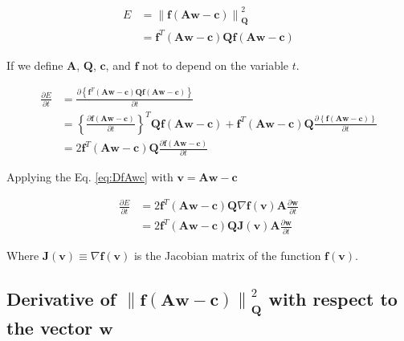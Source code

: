 \begin{align}
E&=\left\|\mathbf{f}\left(\mathbf{A}\mathbf{w}-\mathbf{c}\right)\right\|_{\mathbf{Q}}^2\\
~&=\mathbf{f}^{T}\left(\mathbf{A}\mathbf{w}-\mathbf{c}\right)\mathbf{Q}\mathbf{f}\left(\mathbf{A}\mathbf{w}-\mathbf{c}\right)
\end{align}

If we define $\mathbf{A}$, $\mathbf{Q}$, $\mathbf{c}$, and $\mathbf{f}$ not to depend on the variable $t$.

\begin{align}
\frac{\partial E}{\partial t}
&=\frac{\partial\left\{ \mathbf{f}^{T}\left(\mathbf{A}\mathbf{w}-\mathbf{c}\right)\mathbf{Q}\mathbf{f}\left(\mathbf{A}\mathbf{w}-\mathbf{c}\right)\right\}}{\partial t} \\
~
&=
\left\{\frac{\partial \mathbf{f}\left(\mathbf{A}\mathbf{w}-\mathbf{c}\right)}{\partial t} \right\}^{T}
\mathbf{Q}\mathbf{f}\left(\mathbf{A}\mathbf{w}-\mathbf{c}\right)
+
\mathbf{f}^{T}\left(\mathbf{A}\mathbf{w}-\mathbf{c}\right)\mathbf{Q}
\frac{\partial\left\{ \mathbf{f}\left(\mathbf{A}\mathbf{w}-\mathbf{c}\right)\right\}}{\partial t} \\
~
&=
2
\mathbf{f}^{T}\left(\mathbf{A}\mathbf{w}-\mathbf{c}\right)\mathbf{Q}
\frac{\partial \mathbf{f}\left(\mathbf{A}\mathbf{w}-\mathbf{c}\right)}{\partial t} 
\end{align}

Applying the Eq. \ref{eq:DfAwc} with $\mathbf{v}=\mathbf{A}\mathbf{w}-\mathbf{c}$

\begin{align}
\label{eq:dEdt}
\frac{\partial E}{\partial t}
&=
2
\mathbf{f}^{T}\left(\mathbf{A}\mathbf{w}-\mathbf{c}\right)\mathbf{Q}
\nabla \mathbf{f}(\mathbf{v})
\mathbf{A}\frac{\partial \mathbf{w}}{\partial t}\\
&=
2
\mathbf{f}^{T}\left(\mathbf{A}\mathbf{w}-\mathbf{c}\right)\mathbf{Q}
\mathbf{J}(\mathbf{v})
\mathbf{A}\frac{\partial \mathbf{w}}{\partial t}
\end{align}

Where $\mathbf{J}(\mathbf{v}) \equiv \nabla \mathbf{f}(\mathbf{v})$ is the Jacobian matrix of the function $\mathbf{f}(\mathbf{v})$.

\subsection{Derivative of $\left\|\mathbf{f}\left(\mathbf{A}\mathbf{w}-\mathbf{c}\right)\right\|_{\mathbf{Q}}^2$
with respect to the vector $\mathbf{w}$}
\label{subsec:funcAwcQ2w}

